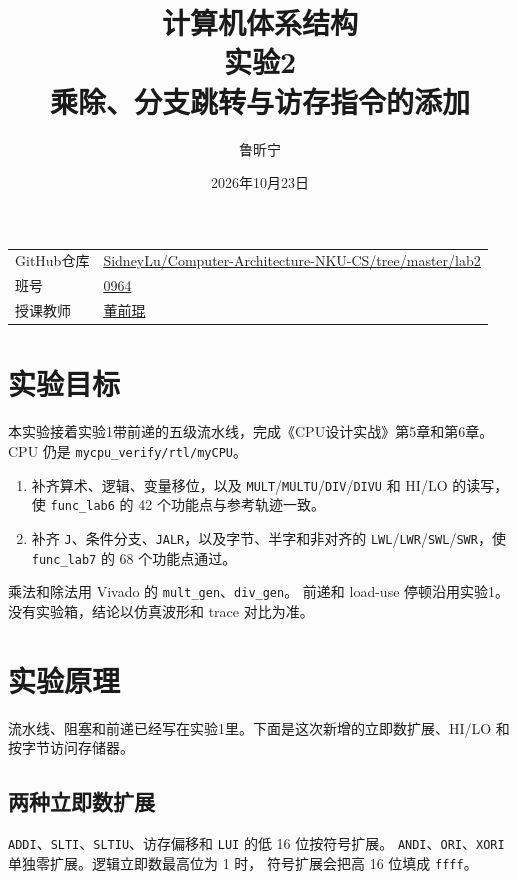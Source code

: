 \documentclass{article}
\title{计算机体系结构\\实验2\\乘除、分支跳转与访存指令的添加}
\author{鲁昕宁 \quad 2414015}
\date{2026年10月23日}
\begin{document}
\maketitle
\begin{center}
\begin{tabular}{ll}
GitHub仓库 & \parbox[t]{0.72\textwidth}{\url{SidneyLu/Computer-Architecture-NKU-CS/tree/master/lab2}} \\[0.6em]
班号 & \underline{0964} \\[0.6em]
授课教师 & \underline{董前琨} \\[0.6em]
\end{tabular}
\end{center}

\newpage

\section{实验目标}
本实验接着实验1带前递的五级流水线，完成《CPU设计实战》第5章和第6章。
CPU 仍是 \texttt{mycpu\_verify/rtl/myCPU}。

\begin{enumerate}
  \item 补齐算术、逻辑、变量移位，以及 \texttt{MULT}/\texttt{MULTU}/\texttt{DIV}/\texttt{DIVU}
        和 HI/LO 的读写，使 \texttt{func\_lab6} 的 42 个功能点与参考轨迹一致。
  \item 补齐 \texttt{J}、条件分支、\texttt{JALR}，以及字节、半字和非对齐的
        \texttt{LWL}/\texttt{LWR}/\texttt{SWL}/\texttt{SWR}，使 \texttt{func\_lab7}
        的 68 个功能点通过。
\end{enumerate}

乘法和除法用 Vivado 的 \texttt{mult\_gen}、\texttt{div\_gen}。
前递和 load-use 停顿沿用实验1。没有实验箱，结论以仿真波形和 trace 对比为准。

\section{实验原理}
流水线、阻塞和前递已经写在实验1里。下面是这次新增的立即数扩展、HI/LO 和按字节访问存储器。

\subsection{两种立即数扩展}
\texttt{ADDI}、\texttt{SLTI}、\texttt{SLTIU}、访存偏移和 \texttt{LUI} 的低 16 位按符号扩展。
\texttt{ANDI}、\texttt{ORI}、\texttt{XORI} 单独零扩展。逻辑立即数最高位为 1 时，
符号扩展会把高 16 位填成 \texttt{ffff}。
\end{document}
